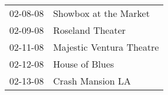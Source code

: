 \begin{supertabular}{p{0.07\textwidth}p{0.23\textwidth}}
 02-08-08 &     Showbox at the Market \\
 02-09-08 &          Roseland Theater \\
 02-11-08 &  Majestic Ventura Theatre \\
 02-12-08 &            House of Blues \\
 02-13-08 &          Crash Mansion LA \\
\end{supertabular}
